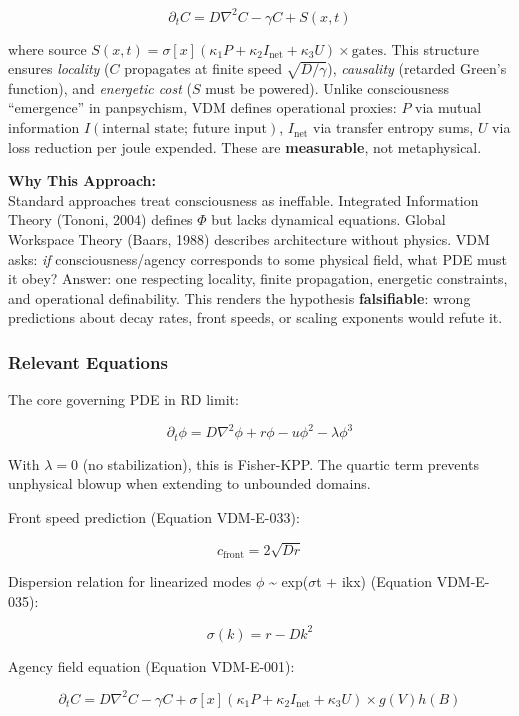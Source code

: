 \documentclass[
]{article}
\begin{document}
\[\partial_t C = D\nabla^{2}C - \gamma C + S(x,t)\]

where source
\(S(x,t) = \sigma[x](\kappa_{1} P + \kappa_{2} I_{\text{net}} + \kappa_{3} U) \times \text{gates}\).
This structure ensures \emph{locality} (\(C\) propagates at finite speed
\(\sqrt{D/\gamma}\)), \emph{causality} (retarded Green's function), and
\emph{energetic cost} (\(S\) must be powered). Unlike consciousness
``emergence'' in panpsychism, VDM defines operational proxies: \(P\) via
mutual information \(I(\text{internal state};\, \text{future input})\),
\(I_{\text{net}}\) via transfer entropy sums, \(U\) via loss reduction
per joule expended. These are \textbf{measurable}, not metaphysical.

\textbf{Why This Approach:}\\
Standard approaches treat consciousness as ineffable. Integrated
Information Theory (Tononi, 2004) defines $\Phi$ but lacks dynamical
equations. Global Workspace Theory (Baars, 1988) describes architecture
without physics. VDM asks: \emph{if} consciousness/agency corresponds to
some physical field, what PDE must it obey? Answer: one respecting
locality, finite propagation, energetic constraints, and operational
definability. This renders the hypothesis \textbf{falsifiable}: wrong
predictions about decay rates, front speeds, or scaling exponents would
refute it.

\hypertarget{relevant-equations}{%
\subsubsection{Relevant Equations}\label{relevant-equations}}

The core governing PDE in RD limit:

\[\partial_t \phi = D\nabla^2\phi + r\phi - u\phi^2 - \lambda\phi^3\]

With $\lambda = 0$ (no stabilization), this is Fisher-KPP. The quartic term
prevents unphysical blowup when extending to unbounded domains.

Front speed prediction (Equation VDM-E-033):

\[c_{\text{front}} = 2\sqrt{Dr}\]

Dispersion relation for linearized modes $\phi$ \textasciitilde{} exp($\sigma$t +
ikx) (Equation VDM-E-035):

\[\sigma(k) = r - Dk^2\]

Agency field equation (Equation VDM-E-001):

\[\partial_t C = D\nabla^2 C - \gamma C + \sigma[x](\kappa_1 P + \kappa_2 I_{\text{net}} + \kappa_3 U) \times g(V)h(B)\]
\end{document}
